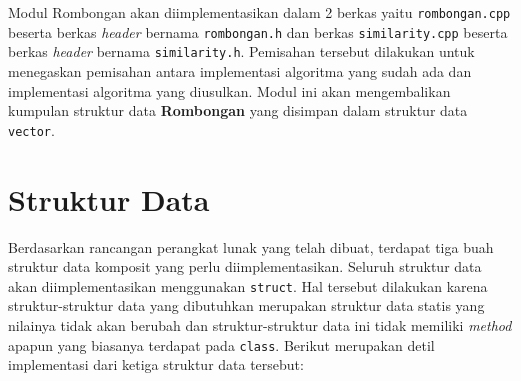Modul Rombongan akan diimplementasikan dalam 2 berkas yaitu \texttt{rombongan.cpp} beserta berkas \textit{header} bernama \texttt{rombongan.h} dan berkas \texttt{similarity.cpp} beserta berkas \textit{header} bernama \texttt{similarity.h}. Pemisahan tersebut dilakukan untuk menegaskan pemisahan antara implementasi algoritma yang sudah ada dan implementasi algoritma yang diusulkan. Modul ini akan mengembalikan kumpulan struktur data \textbf{Rombongan} yang disimpan dalam struktur data \texttt{vector}.

\section{Struktur Data}
\label{sec:impl-struct}

Berdasarkan rancangan perangkat lunak yang telah dibuat, terdapat tiga buah struktur data komposit yang perlu diimplementasikan. Seluruh struktur data akan diimplementasikan menggunakan \texttt{struct}. Hal tersebut dilakukan karena struktur-struktur data yang dibutuhkan merupakan struktur data statis yang nilainya tidak akan berubah dan struktur-struktur data ini tidak memiliki \textit{method} apapun yang biasanya terdapat pada \texttt{class}. Berikut merupakan detil implementasi dari ketiga struktur data tersebut:

